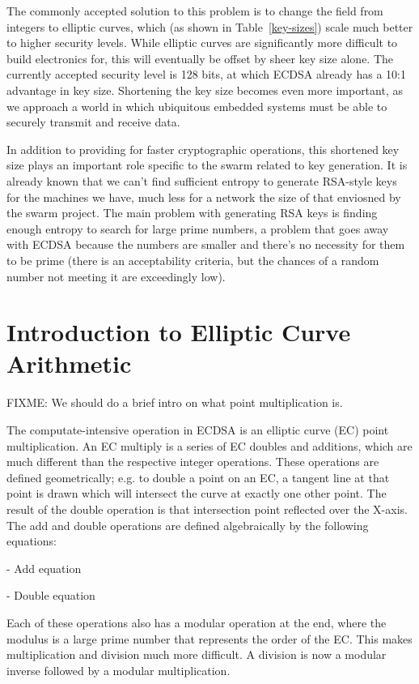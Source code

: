 \documentclass[twocolumn]{article}
\begin{document}
The commonly accepted solution to this problem is to change the field
from integers to elliptic curves, which (as shown in
Table~\ref{key-sizes}) scale much better to higher security levels.
While elliptic curves are significantly more difficult to build
electronics for, this will eventually be offset by sheer key size
alone.  The currently accepted security level is 128 bits, at which
ECDSA already has a 10:1 advantage in key size.  Shortening the key 
size becomes even more important, as we approach a world in which 
ubiquitous embedded systems must be able to securely transmit and 
receive data.

In addition to providing for faster cryptographic operations, this
shortened key size plays an important role specific to the swarm
related to key generation.  It is already known\cite{halderman-shared}
that we can't find sufficient entropy to generate RSA-style keys for
the machines we have, much less for a network the size of that
enviosned by the swarm project.  The main problem with generating RSA
keys is finding enough entropy to search for large prime numbers, a
problem that goes away with ECDSA because the numbers are smaller and
there's no necessity for them to be prime (there is an acceptability
criteria, but the chances of a random number not meeting it are
exceedingly low).

\section{Introduction to Elliptic Curve Arithmetic}

FIXME: We should do a brief intro on what point multiplication is.

The computate-intensive operation in ECDSA is an elliptic curve (EC) point 
multiplication. An EC multiply is a series of EC doubles and additions, which
are much different than the respective integer operations. These operations
are defined geometrically; e.g. to double a point on an EC, a tangent line at that
point is drawn which will intersect the curve at exactly one other point. The result 
of the double operation is that intersection point reflected over the X-axis.
The add and double operations are defined algebraically by the following equations:

- Add equation

- Double equation

Each of these operations also has a modular operation at the end, where the modulus is a 
large prime number that represents the order of the EC. This makes multiplication and division
much more difficult. A division is now a modular inverse followed by a modular multiplication. 
\end{document}

